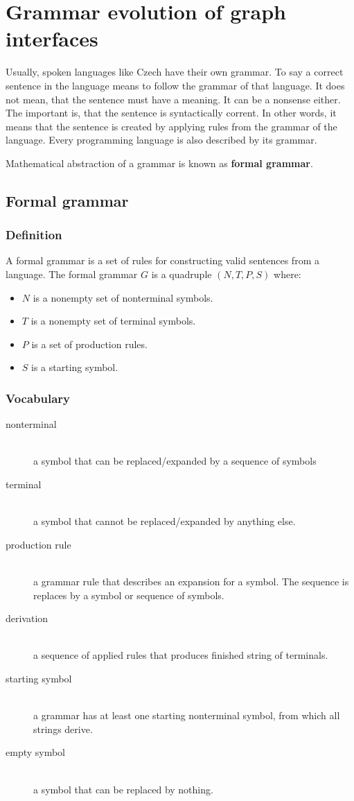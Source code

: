 \chapter{Grammar evolution of graph interfaces}

Usually, spoken languages like Czech have their own grammar. To say a correct sentence in the language means to follow the grammar of that language. It does not mean, that the sentence must have a meaning. It can be a nonsense either. The important is, that the sentence is syntactically corrent. In other words, it means that the sentence is created by applying rules from the grammar of the language. Every programming language is also described by its grammar.

Mathematical abstraction of a grammar is known as \textbf{formal grammar}.
\section{Formal grammar}
  \subsection{Definition}
  A formal grammar is a set of rules for constructing valid sentences from a language. The formal grammar $G$ is a quadruple  $(N, T, P, S)$ \cite{formal-grammar} where:
    \begin{itemize}
      \item $N$ is a nonempty set of nonterminal symbols.
      \item $T$ is a nonempty set of terminal symbols.
      \item $P$ is a set of production rules.
      \item $S$ is a starting symbol.
    \end{itemize}
  \subsection{Vocabulary}
    \begin{description}
      \item[nonterminal] \hfill \\ a symbol that can be replaced/expanded by a sequence of symbols
      \item[terminal] \hfill \\ a symbol that cannot be replaced/expanded by anything else.
      \item[production rule] \hfill \\ a grammar rule that describes an expansion for a symbol. The sequence is replaces by a symbol or sequence of symbols.
      \item[derivation] \hfill \\ a sequence of applied rules that produces finished string of terminals.
      \item[starting symbol] \hfill \\ a grammar has at least one starting nonterminal symbol, from which all strings derive.
      \item[empty symbol] \hfill \\ a symbol that can be replaced by nothing.
    \end{description}

